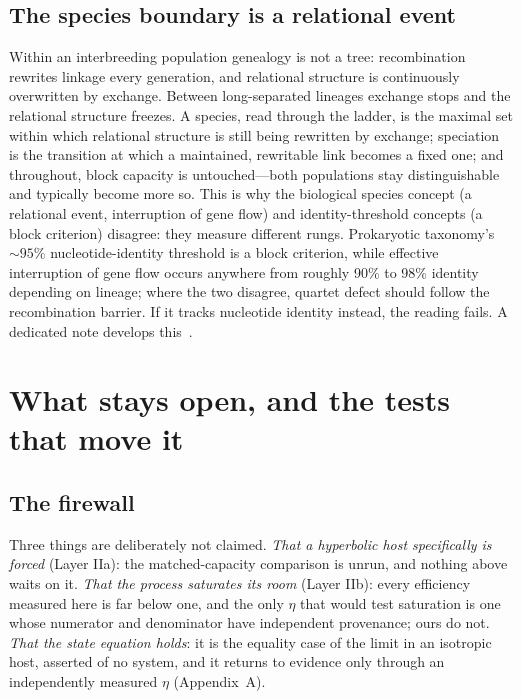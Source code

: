 \documentclass[11pt]{article}
\begin{document}
\subsection{The species boundary is a relational event}
Within an interbreeding population genealogy is not a tree: recombination rewrites linkage every generation, and relational structure is continuously overwritten by exchange. Between long-separated lineages exchange stops and the relational structure freezes. A species, read through the ladder, is the maximal set within which relational structure is still being rewritten by exchange; speciation is the transition at which a maintained, rewritable link becomes a fixed one; and throughout, block capacity is untouched---both populations stay distinguishable and typically become more so. This is why the biological species concept (a relational event, interruption of gene flow) and identity-threshold concepts (a block criterion) disagree: they measure different rungs. Prokaryotic taxonomy's $\sim95\%$ nucleotide-identity threshold is a block criterion, while effective interruption of gene flow occurs anywhere from roughly 90\% to 98\% identity depending on lineage; where the two disagree, quartet defect should follow the recombination barrier. If it tracks nucleotide identity instead, the reading fails. A dedicated note develops this~\cite{fennfenn2026iii}.

\section{What stays open, and the tests that move it}

\subsection{The firewall}
Three things are deliberately not claimed. \emph{That a hyperbolic host specifically is forced} (Layer IIa): the matched-capacity comparison is unrun, and nothing above waits on it. \emph{That the process saturates its room} (Layer IIb): every efficiency measured here is far below one, and the only $\eta$ that would test saturation is one whose numerator and denominator have independent provenance; ours do not. \emph{That the state equation holds}: it is the equality case of the limit in an isotropic host, asserted of no system, and it returns to evidence only through an independently measured $\eta$ (Appendix~A).
\end{document}
